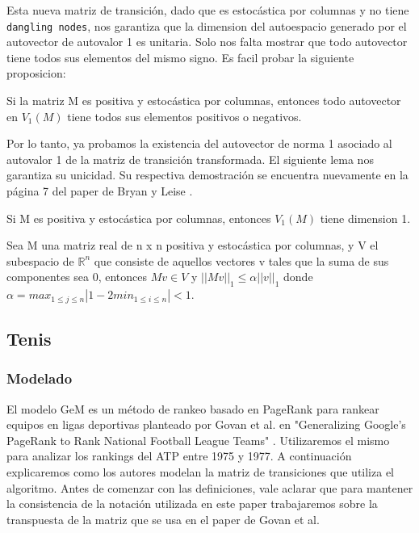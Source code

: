 Esta nueva matriz de transición, dado que es estocástica por columnas y no tiene \texttt{dangling nodes}, nos garantiza que la dimension del autoespacio generado por el autovector de autovalor 1 es unitaria. Solo nos falta mostrar que todo autovector tiene todos sus elementos del mismo signo. Es facil probar la siguiente proposicion:

\begin{proposition}
Si la matriz M es positiva y estocástica por columnas, entonces todo autovector en $V_1(M)$ tiene todos sus elementos positivos o negativos.
\end{proposition}

Por lo tanto, ya probamos la existencia del autovector de norma 1 asociado al autovalor 1 de la matriz de transición transformada. El siguiente lema nos garantiza su unicidad. Su respectiva demostración se encuentra nuevamente en la página 7 del paper de Bryan y Leise \cite{Bryan2006}.

\begin{lemma}
\item Si M es positiva y estocástica por columnas, entonces $V_1(M)$ tiene dimension 1.
\end{lemma}

\begin{proposition}
Sea M una matriz real de n x n positiva y estocástica por columnas, y V el subespacio de $\mathbb{R}^n$ que consiste de aquellos vectores v tales que la suma de sus componentes sea 0, entonces $Mv \in V$ y $||Mv||_1 \leq \alpha||v||_1$ donde $\alpha = max_{1 \leq j \leq n}|1 - 2min_{1 \leq i \leq n}| < 1$.
\end{proposition}

\subsection{Tenis}

\subsubsection{Modelado}

El modelo GeM es un método de rankeo basado en PageRank para rankear equipos en ligas deportivas planteado por Govan et al. en "Generalizing Google's PageRank to Rank National Football League Teams" \cite{Govan2008}. Utilizaremos el mismo para analizar los rankings del ATP entre 1975 y 1977.
A continuación explicaremos como los autores modelan la matriz de transiciones que utiliza el algoritmo. Antes de comenzar con las definiciones, vale aclarar que para mantener la consistencia de la notación utilizada en este paper trabajaremos sobre la transpuesta de la matriz que se usa en el paper de Govan et al.

